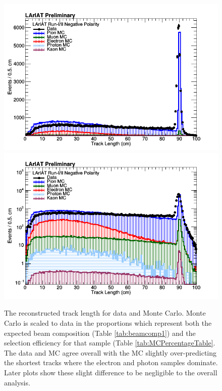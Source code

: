 \begin{figure}[h!]
\centering
\includegraphics[scale=0.33]{./images/TrackLength.png}
\includegraphics[scale=0.33]{./images/TrackLengthLog.png}
\caption{The reconstructed track length for data and Monte Carlo. Monte Carlo is scaled to data in the proportions which represent both the expected beam composition (Table \ref{tab:beamcomp1}) and the selection efficiency for that sample (Table \ref{tab:MCPercentageTable}. The data and MC agree overall with the MC slightly over-predicting the shortest tracks where the electron and photon samples dominate. Later plots show these slight difference to be negligible to the overall analysis.}
\label{fig:DataMCTrackLength}
\end{figure}


